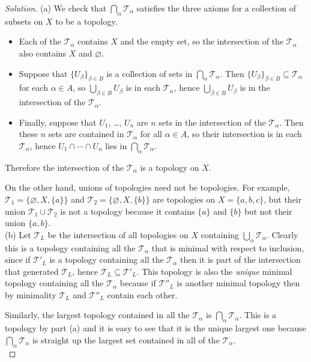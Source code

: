 \documentclass[11pt]{scrartcl}
\providecommand{\ii}{\item}
\newenvironment{soln}{\begin{proof}[Solution]}{\end{proof}}
\begin{document}
\begin{soln}
    (a) We check that $\bigcap_\alpha\mathcal T_\alpha$ satisfies
    the three axioms for a collection of subsets on $X$ to be a topology.
    \begin{itemize}
        \ii Each of the $\mathcal T_\alpha$ contains $X$ and the empty set,
	so the intersection of the $\mathcal T_\alpha$
	also contains $X$ and $\varnothing$.

        \ii Suppose that $\{U_\beta\}_{\beta\in B}$ is a collection
        of sets in $\bigcap_\alpha\mathcal T_\alpha$.
        Then $\{U_\beta\}_{\beta\in B}\subseteq \mathcal T_\alpha$
	for each $\alpha\in A$,
        so $\bigcup_{\beta\in B}U_\beta$ is in each $\mathcal T_\alpha$,
        hence $\bigcup_{\beta\in B}U_\beta$ is in the intersection of the
        $\mathcal T_\alpha$.

	\ii Finally, suppose that $U_1$, \dots, $U_n$ are $n$ sets in the intersection
	of the $\mathcal T_\alpha$. Then these $n$ sets are contained
	in $\mathcal T_\alpha$ for all $\alpha\in A$, so
	their intersection is in each $\mathcal T_\alpha$,
	hence $U_1\cap\cdots\cap U_n$ lies in $\bigcap_{\alpha}\mathcal T_\alpha$.
    \end{itemize}
    Therefore the intersection of the $\mathcal T_\alpha$ is a topology on $X$.

    On the other hand, unions of topologies need not be topologies.
    For example, $\mathcal T_1 = \{\varnothing, X, \{a\}\}$
    and $\mathcal T_2 = \{\varnothing, X, \{b\}\}$ are topologies
    on $X = \{a,b,c\}$, but their union $\mathcal T_1\cup\mathcal T_2$
    is not a topology because it contains $\{a\}$ and $\{b\}$
    but not their union $\{a, b\}$.\\

    (b) Let $\mathcal T_L$ be the intersection of all topologies on $X$
    containing $\bigcup_\alpha\mathcal T_\alpha$.
    Clearly this is a topology containing all the $\mathcal T_\alpha$
    that is minimal with respect to inclusion,
    since if $\mathcal T'_L$ is a topology containing all the $\mathcal T_\alpha$
    then it is part of the intersection that generated $\mathcal T_L$,
    hence $\mathcal T_L\subseteq\mathcal T'_L$.
    This topology is also the \emph{unique} minimal topology
    containing all the $\mathcal T_\alpha$ because
    if $\mathcal T''_L$ is another minimal topology
    then by minimality $\mathcal T_L$ and $\mathcal T''_L$ contain each other.

    Similarly, the largest topology contained in all the $\mathcal T_\alpha$
    is $\bigcap_\alpha \mathcal T_\alpha$. This is a topology by part (a)
    and it is easy to see that it is the unique largest one
    because $\bigcap_\alpha\mathcal T_\alpha$ is straight up
    the largest set contained in all of the $\mathcal T_\alpha$.\\


\end{soln}
\end{document}
